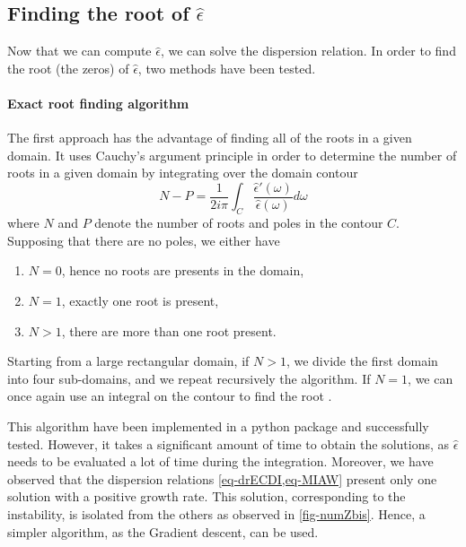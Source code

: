   \subsection{Finding the root of \texorpdfstring{$\hat\epsilon$}{the plasma dielectric function.} }

  Now that we can compute $\hat\epsilon$, we can solve the dispersion relation.
  In order to find the root (the zeros) of $\hat\epsilon$, two methods have been tested.
  
  
  \paragraph{Exact root finding algorithm\\}
    The first approach has the advantage of finding all of the roots in a given domain.
    It uses Cauchy's argument principle in order to determine the number of roots in a given domain by integrating over the domain contour
    \begin{equation} \label{eq-rootnumber}
      N - P = \frac{1}{2 i \pi} \int_{C} \frac{\hat\epsilon'(\omega)}{\hat\epsilon(\omega)} d\omega
    \end{equation}
    where $N$ and $P$ denote the number of roots and poles in the contour $C$.
    Supposing that there are no poles, we either have
    \begin{enumerate}
      \item $N=0$, hence no roots are presents in the domain,
      \item $N=1$, exactly one root is present,
      \item $N>1$, there are more than one root present.
    \end{enumerate}

    Starting from a large rectangular domain, if $N>1$, we divide the first domain into four sub-domains, and we repeat recursively the algorithm.
    If $N=1$, we can once again use an integral on the contour to find the root \citep{fortune2001}.
    
    \vspace{1em}
    This algorithm have been implemented in a python package and successfully tested.
    However, it takes a significant amount of time to obtain the solutions, as $\hat\epsilon$ needs to be evaluated a lot of time during the integration.
    Moreover, we have observed that the dispersion relations \cref{eq-drECDI,eq-MIAW} present only one solution with a positive growth rate.
    This solution, corresponding to the instability, is isolated from the others as observed in \cref{fig-numZbis}.
    Hence, a simpler algorithm, as the Gradient descent, can be used.
    
